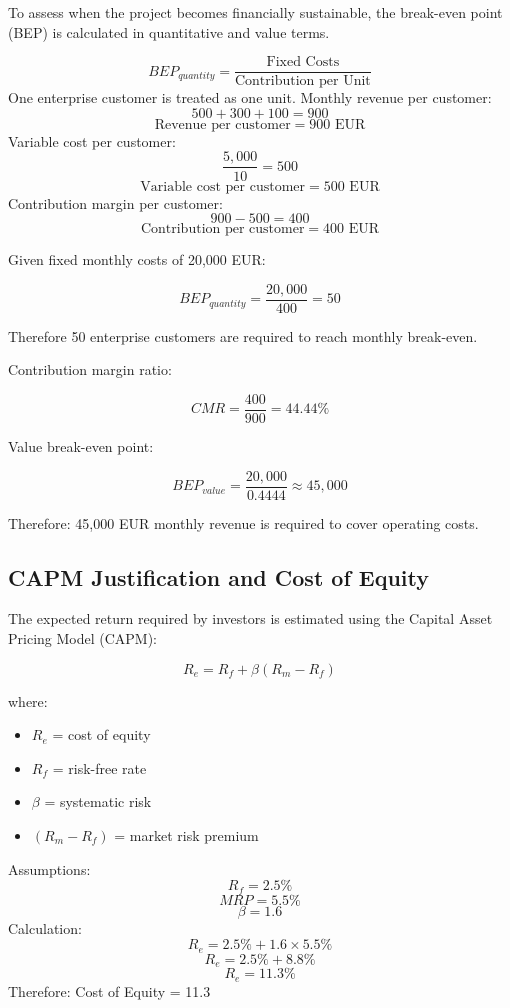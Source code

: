 \documentclass[12pt,a4paper,oneside]{article}
\theoremstyle{definition}
\theoremstyle{plain}
\begin{document}
To assess when the project becomes financially sustainable, the break-even point (BEP) is calculated in quantitative and value terms.

\[
BEP_{quantity}
=
\frac{\text{Fixed Costs}}{\text{Contribution per Unit}}
\]
One enterprise customer is treated as one unit.
Monthly revenue per customer:
\[
500 + 300 + 100 = 900
\]
\[
\text{Revenue per customer} = 900 \text{ EUR}
\]
Variable cost per customer:
\[
\frac{5{,}000}{10} = 500
\]
\[
\text{Variable cost per customer} = 500 \text{ EUR}
\]
Contribution margin per customer:
\[
900 - 500 = 400
\]
\[
\text{Contribution per customer} = 400 \text{ EUR}
\]

Given fixed monthly costs of 20,000 EUR:

\[
BEP_{quantity}
=
\frac{20{,}000}{400}
=
50
\]

Therefore 50 enterprise customers are required to reach monthly break-even.

Contribution margin ratio:

\[
CMR
=
\frac{400}{900}
=
44.44\%
\]

Value break-even point:

\[
BEP_{value}
=
\frac{20{,}000}{0.4444}
\approx
45{,}000
\]

Therefore: 45{,}000 EUR monthly revenue is required to cover operating costs.

\subsection{CAPM Justification and Cost of Equity}

The expected return required by investors is estimated using the Capital Asset Pricing Model (CAPM):

\[
R_e = R_f + \beta (R_m - R_f)
\]

where:

\begin{itemize}
    \item $R_e$ = cost of equity
    \item $R_f$ = risk-free rate
    \item $\beta$ = systematic risk
    \item $(R_m - R_f)$ = market risk premium
\end{itemize}

Assumptions:
\[
R_f = 2.5\%
\]
\[
MRP = 5.5\%
\]
\[
\beta = 1.6
\]
Calculation:
\[
R_e
=
2.5\%
+
1.6 \times 5.5\%
\]
\[
R_e
=
2.5\%
+
8.8\%
\]
\[
R_e
=
11.3\%
\]
Therefore: Cost of Equity = 11.3
\end{document}

